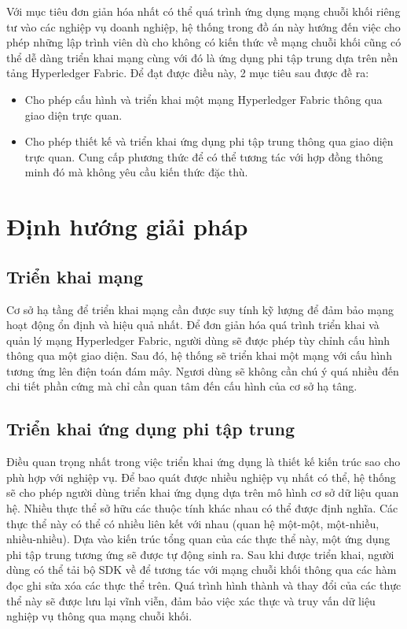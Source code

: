 \documentclass[../DoAn.tex]{subfiles}
\begin{document}
Với mục tiêu đơn giản hóa nhất có thể quá trình ứng dụng mạng chuỗi khối riêng tư vào các nghiệp vụ doanh nghiệp, hệ thống trong đồ án này hướng đến việc cho phép những lập trình viên dù cho không có kiến thức về mạng chuỗi khối cũng có thể dễ dàng triển khai mạng cùng với đó là ứng dụng phi tập trung dựa trên nền tảng Hyperledger Fabric. Để đạt được điều này, 2 mục tiêu sau được đề ra:
\begin{itemize}
	\item Cho phép cấu hình và triển khai một mạng Hyperledger Fabric thông qua giao diện trực quan.
	\item Cho phép thiết kế và triển khai ứng dụng phi tập trung thông qua giao diện trực quan. Cung cấp phương thức để có thể tương tác với hợp đồng thông minh đó mà không yêu cầu kiến thức đặc thù.
\end{itemize}

\section{Định hướng giải pháp}
\label{section:1.3}

\subsection{Triển khai mạng}
Cơ sở hạ tầng để triển khai mạng cần được suy tính kỹ lượng để đảm bảo mạng hoạt động ổn định và hiệu quả nhất. Để đơn giản hóa quá trình triển khai và quản lý mạng Hyperledger Fabric, người dùng sẽ được phép tùy chỉnh cấu hình thông qua một giao diện. Sau đó, hệ thống sẽ triển khai một mạng với cấu hình tương ứng lên điện toán đám mây. Ngươi dùng sẽ không cần chú ý quá nhiều đến chi tiết phần cứng mà chỉ cần quan tâm đến cấu hình của cơ sở hạ tâng. 
\subsection{Triển khai ứng dụng phi tập trung}
Điều quan trọng nhất trong việc triển khai ứng dụng là thiết kế kiến trúc sao cho phù hợp với nghiệp vụ. Để bao quát được nhiều nghiệp vụ nhất có thể, hệ thống sẽ cho phép người dùng triển khai ứng dụng dựa trên mô hình cơ sở dữ liệu quan hệ. Nhiều thực thể sở hữu các thuộc tính khác nhau có thể được định nghĩa. Các thực thể này có thể có nhiều liên kết với nhau (quan hệ một-một, một-nhiều, nhiều-nhiều). Dựa vào kiến trúc tổng quan của các thực thể này, một ứng dụng phi tập trung tương ứng sẽ được tự động sinh ra. Sau khi được triển khai, người dùng có thể tải bộ SDK về để tương tác với mạng chuỗi khối thông qua các hàm đọc ghi sửa xóa các thực thể trên. Quá trình hình thành và thay đổi của các thực thể này sẽ được lưu lại vĩnh viễn, đảm bảo việc xác thực và truy vấn dữ liệu nghiệp vụ thông qua mạng chuỗi khối.
\end{document}

